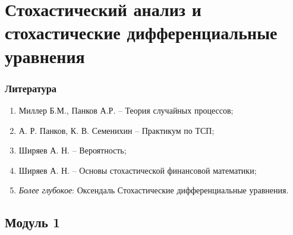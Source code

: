 \documentclass[../konspect.tex]{subfiles}
\begin{document}
  \part{Стохастический анализ и стохастические дифференциальные уравнения}

  \section*{Литература}
  \begin{enumerate}
    \item Миллер Б.М., Панков А.Р. -- Теория случайных процессов;
    \item А. Р. Панков, К. В. Семенихин -- Практикум по ТСП;
    \item Ширяев А. Н. -- Вероятность;
    \item Ширяев А. Н. -- Основы стохастической финансовой математики;

    \item \textit{Более глубокое}: Оксендаль Стохастические дифференциальные уравнения.
  \end{enumerate}

  \chapter{Модуль 1}
  
  
  
  
  
  
\end{document}
